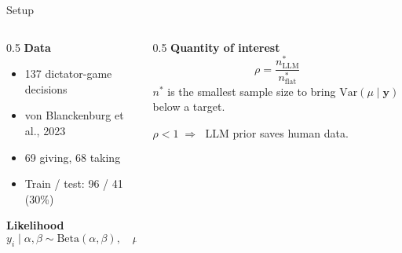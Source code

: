 \documentclass[10pt, aspectratio=169]{beamer}
\begin{document}
\begin{frame}{Setup}
\begin{columns}[T]
\begin{column}{0.5\textwidth}
\textbf{Data}
\begin{itemize}\setlength{\itemsep}{2pt}
  \item 137 dictator-game decisions
  \item von Blanckenburg et al., 2023
  \item 69 giving, 68 taking
  \item Train / test: 96 / 41 (30\%)
\end{itemize}
\vspace{0.5em}
\textbf{Likelihood}
\begin{equation*}
  y_i \mid \alpha, \beta \sim \mathrm{Beta}(\alpha, \beta), \quad \mu = \tfrac{\alpha}{\alpha+\beta}
\end{equation*}
\end{column}
\begin{column}{0.5\textwidth}
\textbf{Quantity of interest}
\begin{equation*}
  \rho = \frac{n^*_{\text{LLM}}}{n^*_{\text{flat}}}
\end{equation*}
$n^*$ is the smallest sample size to bring $\mathrm{Var}(\mu \mid \mathbf{y})$ below a target.
\vspace{0.4em}

$\rho < 1 \;\Rightarrow\;$ LLM prior saves human data.
\end{column}
\end{columns}
\end{frame}
\end{document}
